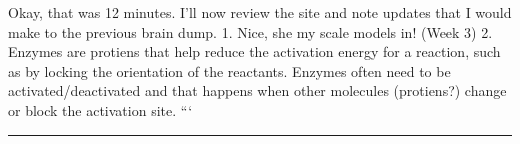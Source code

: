 \documentclass[letterpaper]{article}
\begin{document}
Okay, that was 12 minutes. I'll now review the site and note updates
that I would make to the previous brain dump. 1. Nice, she my scale
models in! (Week 3) 2. Enzymes are protiens that help reduce the
activation energy for a reaction, such as by locking the orientation of
the reactants. Enzymes often need to be activated/deactivated and that
happens when other molecules (protiens?) change or block the activation
site. ```

\noindent\rule{\textwidth}{0.5pt}
\end{document}
